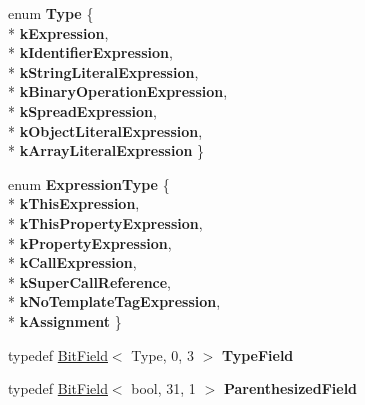 \begin{DoxyCompactItemize}
\item 
enum {\bfseries Type} \{ \\*
{\bfseries k\+Expression}, 
\\*
{\bfseries k\+Identifier\+Expression}, 
\\*
{\bfseries k\+String\+Literal\+Expression}, 
\\*
{\bfseries k\+Binary\+Operation\+Expression}, 
\\*
{\bfseries k\+Spread\+Expression}, 
\\*
{\bfseries k\+Object\+Literal\+Expression}, 
\\*
{\bfseries k\+Array\+Literal\+Expression}
 \}\hypertarget{classv8_1_1internal_1_1_pre_parser_expression_aacbaeb3dce47a69add4fe50af958e491}{}\label{classv8_1_1internal_1_1_pre_parser_expression_aacbaeb3dce47a69add4fe50af958e491}

\item 
enum {\bfseries Expression\+Type} \{ \\*
{\bfseries k\+This\+Expression}, 
\\*
{\bfseries k\+This\+Property\+Expression}, 
\\*
{\bfseries k\+Property\+Expression}, 
\\*
{\bfseries k\+Call\+Expression}, 
\\*
{\bfseries k\+Super\+Call\+Reference}, 
\\*
{\bfseries k\+No\+Template\+Tag\+Expression}, 
\\*
{\bfseries k\+Assignment}
 \}\hypertarget{classv8_1_1internal_1_1_pre_parser_expression_ad246b00a1e13491c81273c95d7c400aa}{}\label{classv8_1_1internal_1_1_pre_parser_expression_ad246b00a1e13491c81273c95d7c400aa}

\item 
typedef \hyperlink{classv8_1_1internal_1_1_bit_field}{Bit\+Field}$<$ Type, 0, 3 $>$ {\bfseries Type\+Field}\hypertarget{classv8_1_1internal_1_1_pre_parser_expression_a5e2cc2653df24663e75cf04f6960728d}{}\label{classv8_1_1internal_1_1_pre_parser_expression_a5e2cc2653df24663e75cf04f6960728d}

\item 
typedef \hyperlink{classv8_1_1internal_1_1_bit_field}{Bit\+Field}$<$ bool, 31, 1 $>$ {\bfseries Parenthesized\+Field}\hypertarget{classv8_1_1internal_1_1_pre_parser_expression_a49463e92b245aa0d990e3a9ac95fb80d}{}\label{classv8_1_1internal_1_1_pre_parser_expression_a49463e92b245aa0d990e3a9ac95fb80d}


\end{DoxyCompactItemize}
